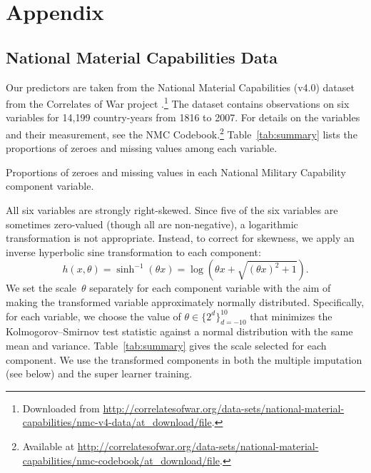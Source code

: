 \section{Appendix}

\subsection{National Material Capabilities Data}

Our predictors are taken from the National Material Capabilities (v4.0) dataset from the Correlates of War project \citep{singer1972}.\footnote{
  Downloaded from \url{http://correlatesofwar.org/data-sets/national-material-capabilities/nmc-v4-data/at_download/file}.
}
The dataset contains observations on six variables for 14,199 country-years from 1816 to 2007.
For details on the variables and their measurement, see the NMC Codebook.\footnote{
  Available at \url{http://correlatesofwar.org/data-sets/national-material-capabilities/nmc-codebook/at_download/file}.
}
Table~\ref{tab:summary} lists the proportions of zeroes and missing values among each variable.

\begin{table}[htp]
  \centering
  
  \caption{
    Proportions of zeroes and missing values in each National Military Capability component variable.
  }
  \label{tab:summary}
\end{table}

All six variables are strongly right-skewed.
Since five of the six variables are sometimes zero-valued (though all are non-negative), a logarithmic transformation is not appropriate.
Instead, to correct for skewness, we apply an inverse hyperbolic sine transformation \citep{Burbidge:1988gu} to each component:
\begin{equation}
  \label{eq:asinh}
  h(x, \theta)
  =
  \sinh^{-1} (\theta x)
  =
  \log \left(
    \theta x + \sqrt{(\theta x)^2 + 1}
  \right).
\end{equation}
We set the scale~$\theta$ separately for each component variable with the aim of making the transformed variable approximately normally distributed.
Specifically, for each variable, we choose the value of $\theta \in \{2^d\}_{d=-10}^{10}$ that minimizes the Kolmogorov--Smirnov test statistic \citep{MasseyJr:2012jo} against a normal distribution with the same mean and variance.
Table~\ref{tab:summary} gives the scale selected for each component.
We use the transformed components in both the multiple imputation (see below) and the super learner training.

